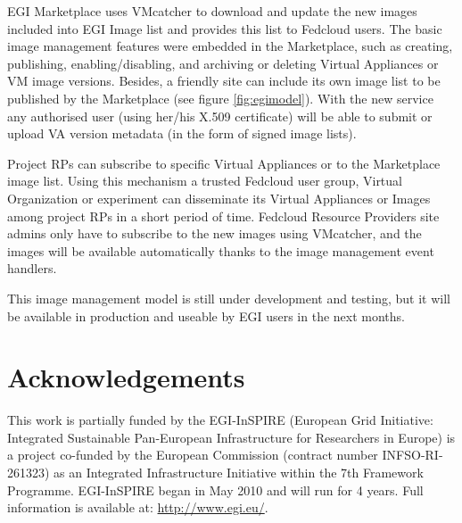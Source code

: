 \documentclass{cai}
\begin{document}
EGI Marketplace uses VMcatcher to download and update the new images included into EGI Image list and provides this list to Fedcloud users.  
The basic image management features were embedded in the Marketplace, such as creating, publishing, enabling/disabling, and archiving or deleting Virtual Appliances or VM image versions.
Besides, a friendly site can include its own image list to be published by the Marketplace (see figure \ref{fig:egimodel}). 
With the new service any authorised user (using her/his X.509 certificate) will be able to submit or upload VA version metadata (in the form of signed image lists).
 
Project RPs can subscribe to specific Virtual Appliances or to the Marketplace image list. Using this mechanism a trusted Fedcloud user group, Virtual Organization or experiment can disseminate its Virtual Appliances or Images among project RPs in a short period of time.
Fedcloud Resource Providers site admins only have to subscribe to the new images using VMcatcher, and the images will be available automatically thanks to the image management event handlers.

This image management model is still under development and testing, but it will be available in production and useable by EGI users in the next months.

\section{Acknowledgements}
\label{sect-acknowledgements}
This work is partially funded by the  EGI-InSPIRE (European Grid Initiative: Integrated Sustainable
Pan-European Infrastructure for Researchers in Europe) is a project co-funded by the European Commission 
(contract number INFSO-RI-261323) as an Integrated Infrastructure Initiative within the 7th Framework 
Programme. EGI-InSPIRE began in May 2010 and will run for 4 years. Full information is available at:
\url{http://www.egi.eu/}.
\end{document}
